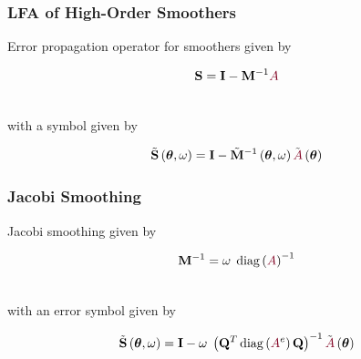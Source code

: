 \documentclass{beamer}
\DeclareMathOperator{\diag}{diag}
\begin{document}

\begin{frame}
\begin{center}
\frametitle{LFA of High-Order Smoothers}

Error propagation operator for smoothers given by

\vspace{-4mm}

\begin{equation}
\mathbf{S} = \mathbf{I} - \mathbf{M}^{-1} {\color{burgundy}A}
\end{equation}

~\\

with a symbol given by

\vspace{-4mm}

\begin{equation}
\tilde{\mathbf{S}} \left( \boldsymbol{\theta}, \omega \right) = \mathbf{I} - \tilde{\mathbf{M}}^{-1} \left( \boldsymbol{\theta}, \omega \right) \tilde{{\color{burgundy}A}} \left( \boldsymbol{\theta} \right)
\end{equation}

\end{center}
\end{frame}


\begin{frame}
\begin{center}
\frametitle{Jacobi Smoothing}

Jacobi smoothing given by

\vspace{-4mm}

\begin{equation}
\mathbf{M}^{-1} = \omega \hspace{1mm} \diag \left( {\color{burgundy}A} \right)^{-1}
\end{equation}

~\\

with an error symbol given by

\vspace{-4mm}

\begin{equation}
\tilde{\mathbf{S}} \left( \boldsymbol{\theta}, \omega \right) = \mathbf{I} - \omega \hspace{1mm} \left( \mathbf{Q}^T \diag \left( {\color{burgundy}A}^e \right) \mathbf{Q} \right)^{-1} \tilde{{\color{burgundy}A}} \left( \boldsymbol{\theta} \right)
\end{equation}

\end{center}
\end{frame}
\end{document}
